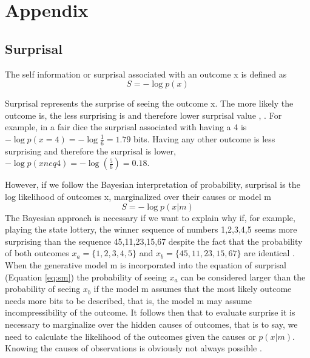 \documentclass[11pt,twocolumn]{article}
\newcommand{\myreferences}{C:/workspace/gitgub/bibliography-jgr/bibliojgr}
\begin{document}
%


\section*{Appendix}
\label{se:ap}
\subsection{Surprisal}
The self information or surprisal associated with an outcome x is defined as 
\begin{equation}
S = -\log p(x)
\label{eq:s}
\end{equation}

Surprisal represents  the surprise of seeing the outcome x. The more likely the outcome is, the less surprising is and therefore lower surprisal value \cite{tribus_thermostatics_1961},  \cite{barto_novelty_2013}. For example, in a fair dice the surprisal associated with having a 4 is $-\log p(x =4) = -\log \frac{1}{6} =1.79$ bits. Having any other outcome is less surprising and therefore the surprisal is lower, $-\log p(x neq 4) = -\log (\frac{5}{6}) =0.18$.

However, if we follow the Bayesian interpretation of probability, surprisal is the log likelihood of outcomes x,  marginalized over their causes or model m
\begin{equation}
S = -\log p(x|m)
\label{eq:sm}
\end{equation}
The Bayesian approach is necessary if we want to explain why if, for example, playing the state lottery, the winner sequence of numbers 1,2,3,4,5 seems more surprising than the sequence 45,11,23,15,67 despite the fact that the probability of both outcomes $x_a=\{1,2,3,4,5\}$ and $x_b=\{45,11,23,15,67\}$ are identical \cite{palm_novelty_2012}. When the generative model m is incorporated into the equation of surprisal (Equation \ref{eq:sm}) the probability of seeing $x_a$ can be considered larger than  the probability of seeing $x_b$ if the model m assumes that the most likely outcome needs more bits to be described, that is, the model m may assume incompressibility of the outcome. It follows then that to evaluate surprise it is necessary to marginalize over the hidden causes of outcomes, that is to say, we need to calculate the likelihood of the outcomes given the causes or $p(x|m)$. Knowing the causes of observations is obviously not always possible \citep{gomez-ramirez_dont_2013}. 
\end{document}

